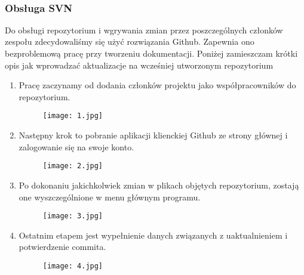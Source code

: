 \begin{lstlisting}


\end{lstlisting}


\subsubsection{Obsługa SVN}
Do obsługi repozytorium i wgrywania zmian przez poszczególnych członków zespołu zdecydowaliśmy się użyć rozwiązania Github. Zapewnia ono bezproblemową pracę przy tworzeniu dokumentacji. \newline
Poniżej zamieszczam krótki opis jak wprowadzać aktualizacje na wcześniej utworzonym repozytorium 


\begin{enumerate}
\item Pracę zaczynamy od dodania członków projektu jako współpracowników do repozytorium.
\begin{figure}[h]
\centering
\texttt{[image: 1.jpg]}
\end{figure}
\item Następny krok to pobranie aplikacji klienckiej Github ze strony głównej i zalogowanie się na swoje konto.
\begin{figure}[h]
\centering
\texttt{[image: 2.jpg]}
\end{figure}
\newpage
\item Po dokonaniu jakichkolwiek zmian w plikach objętych repozytorium, zostają one wyszczególnione w menu głównym programu.
\begin{figure}[h]
\centering
\texttt{[image: 3.jpg]}
\end{figure}
\item Ostatnim etapem jest wypełnienie danych związanych z uaktualnieniem i potwierdzenie commita.
\begin{figure}[h]
\centering
\texttt{[image: 4.jpg]}
\end{figure}
\end{enumerate}

